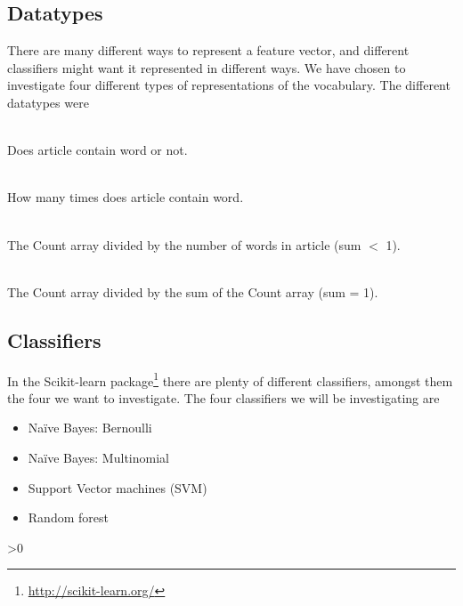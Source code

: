 	\subsection{Datatypes}
	There are many different ways to represent a feature vector, and different classifiers might want it represented in different ways. We have chosen to investigate four different types of representations of the vocabulary. The different datatypes were
	\begin{description}
		\item[Binary:]\ \\Does article contain word or not.
		\item[Count:]\ \\How many times does article contain word.
		\item[Normalized Count by article length:]\ \\ The Count array divided by the number of words in article (sum $<$ 1).
		\item[Normalized Count by sum of Count:]\ \\ The Count array divided by the sum of the Count array (sum = 1). 
	\end{description}

	\subsection{Classifiers}
	In the Scikit-learn package\footnote{\url{http://scikit-learn.org/}} there are plenty of different classifiers, amongst them the four we want to investigate. The four classifiers we will be investigating are
	\begin{itemize}[noitemsep,nolistsep]
		\item Naïve Bayes: Bernoulli
		\item Naïve Bayes: Multinomial
		\item Support Vector machines (SVM)
		\item Random forest 
	\end{itemize}

\ifnum\printdraft>0
